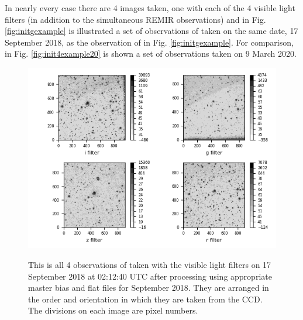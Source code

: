 In nearly every case there are 4 images taken, one with each of the 4 visible
light filters (in addition to the simultaneous REMIR observations) and in Fig.
\ref{fig:initgexample} is illustrated a set of observations of {\prox} taken on
the same date, 17 September 2018, as the observation of {\bstar} in Fig.
\ref{fig:initgexample}. For comparison, in Fig. \ref{fig:init4example20} is
shown a set of observations taken on 9 March 2020.

\begin{figure}[!htbp]
\begin{center}
\includegraphics[scale=1]{images/init4example.png}
\end{center}   
\caption{This is all 4 observations of {\prox} taken with the visible light
filters on 17 September 2018 at 02:12:40 UTC after processing using
appropriate master bias and flat files for September 2018. They are arranged in
the order and orientation in which they are taken from the CCD. The
divisions on each image are pixel numbers.}
\protect\label{fig:init4example}
\end{figure}

